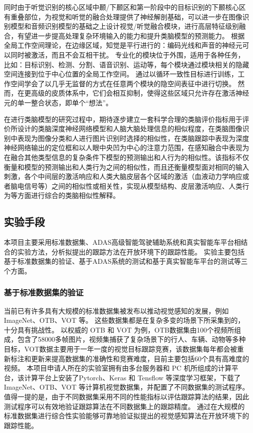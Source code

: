 \documentclass[a4paper,zihao=-4]{article}
\begin{document}
同时由于听觉识别的核心区域中颞/下颞区和第一阶段中的目标识别的下颞核心区有重叠部位，为视觉和听觉的融合处理提供了神经解剖基础，可以进一步在图像识别模型和音频识别模型的基础之上设计视觉/听觉融合模块，进行高层特征级别融合，有望进一步提高处理复杂环境输入的能力和提升类脑模型的预测能力。
根据全局工作空间理论，在边缘区域，知觉是平行进行的：编码光线和声音的神经元可以同时被激活，而且不会互相干扰。
专业化的模块位于外围，适用于各种任务，比如：目标识别、检测、分割、语音识别、运动等，每个模块通过模块相关的隐藏空间连接到位于中心位置的全局工作空间。
通过以循环一致性目标进行训练，工作空间学会了以几乎无监督的方式在任意两个模块的隐空间表征中进行切换。
然而，在更高级的皮质体系中，它们会相互抑制，使得这些区域只允许存在激活神经元的单一整合状态，即单个“想法”。

在进行类脑模型的研究过程中，期待逐步建立一套科学合理的类脑评价指标用于评价所设计的类脑深度神经网络模型和人脑大脑处理信息的相似程度，在类脑图像识别中表现为图像分类和人进行图片识别时选择的相似性，在类脑跟踪中表现为深度神经网络输出的定位框和以人眼中央凹为中心的注意力范围，在感知融合中表现为在融合其他类型信息的复杂条件下模型的预测输出和人行为的相似性。该指标不仅衡量和模型的预测输出和人类行为之间的相似性，而且还衡量模型面对相同的输入刺激，各个中间层的激活响应和人类大脑皮层各个区域的激活（血液动力学响应或者脑电信号等）之间的相似性或相关性，实现从模型结构、皮层激活响应、人类行为等方面进行综合的类脑相似性解释。


\textcolor{NsfcBlue}{\subsection{实验手段}}
本项目主要采用标准数据集、ADAS高级智能驾驶辅助系统和真实智能车平台相结合的实验方法，分析拟提出的跟踪方法在开放环境下的跟踪性能。
实验主要包括基于标准数据集的验证、基于ADAS系统的测试和基于真实智能车平台的测试等三个方面。

\subsubsection{基于标准数据集的验证}
当前已有许多具有大规模的标准数据集被发布以推动视觉感知的发展，例如 ImageNet、OTB、VOT 等。
这些数据集都是在复杂多变的场景下所采集到的，十分具有挑战性。
以权威的 OTB 和 VOT 为例，OTB数据集由100个视频所组成，包含了58000多帧图片，视频集捕获了复杂场景下的行人、车辆、动物等多种目标，VOT数据主要用于一年一度的视觉目标跟踪竞赛，该数据集每年都会被重新标注和更新来提高数据集的准确性和竞赛难度，目前主要包括60个具有高难度的视频。
本项目申请人所在的实验室拥有由多台服务器和 PC 机所组成的计算平台，该计算平台上安装了Pytorch、Keras 和 Tensflow 等深度学习框架，下载了 ImageNet、OTB、VOT 等计算机视觉数据集，并配置了不同数据集的测试程序。
值得一提的是，由于不同数据集采用不同的性能指标以评估跟踪算法的结果，因此测试程序可以有效地验证跟踪算法在不同数据集上的跟踪精度。
通过在大规模的标准数据集进行综合性实验能够可靠地验证拟提出的视觉感知算法在开放环境下的跟踪性能。
\end{document}
